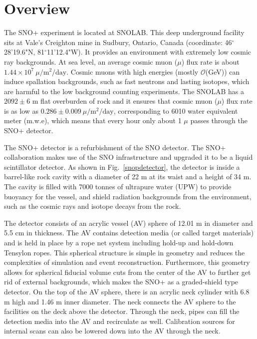 
\section{Overview}\label{sect:overview}
The SNO+ experiment is located at SNOLAB. This deep underground facility sits at Vale's Creighton mine in Sudbury, Ontario, Canada (coordinate: 46$^\circ$28'19.6"N, 81$^\circ$11'12.4"W). It provides an environment with extremely low cosmic ray backgrounds. At sea level, an average cosmic muon ($\mu$) flux rate is about $1.44\times 10^7~\mu/\mathrm{m^2/day}$\cite{muonflux}. Cosmic muons with high energies (mostly $\mathcal{O}$(GeV)) can induce spallation backgrounds, such as fast neutrons and lasting isotopes, which are harmful to the low background counting experiments\cite{beacom2017physics}. The SNOLAB has a $2092\pm6$ m flat overburden of rock and it ensures that cosmic muon ($\mu$) flux rate is as low as $0.286\pm0.009~\mu/\mathrm{m^2/day}$, corresponding to 6010 water equivalent meter (m.w.e)\cite{snop_jinst}, which means that every hour only about 1 $\mu$ passes through the SNO+ detector.

The SNO+ detector is a refurbishment of the SNO detector. The SNO+ collaboration makes use of the SNO infrastructure and upgraded it to be a liquid scintillator detector. As shown in Fig.~\ref{snopdetector}, the detector is inside a barrel-like rock cavity with a diameter of 22 m at its waist and a height of 34 m. The cavity is filled with 7000 tonnes of ultrapure water (UPW) to provide buoyancy for the vessel, and shield radiation backgrounds from the environment, such as the cosmic rays and isotope decays from the rock. 

The detector consists of an acrylic vessel (AV) sphere of 12.01 m in diameter and 5.5 cm in thickness. The AV contains detection media (or called target materials) and is held in place by a rope net system including hold-up and hold-down Tensylon ropes. This spherical structure is simple in geometry and reduces the complexities of simulation and event reconstruction. Furthermore, this geometry allows for spherical fiducial volume cuts from the center of the AV to further get rid of external backgrounds, which makes the SNO+ as a graded-shield type detector\cite{waterfield2017optical}.
On the top of the AV sphere, there is an acrylic neck cylinder with 6.8 m high and 1.46 m inner diameter. The neck connects the AV sphere to the facilities on the deck above the detector. Through the neck, pipes can fill the detection media into the AV and recirculate as well. Calibration sources for internal scans can also be lowered down into the AV through the neck.

